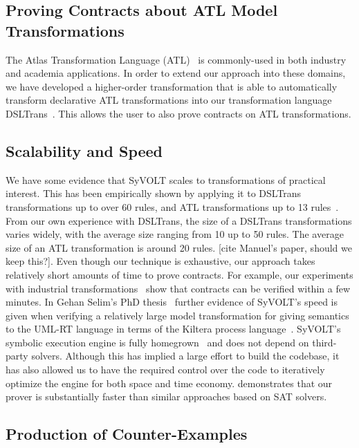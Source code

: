\subsection{Proving Contracts about ATL Model Transformations}
The Atlas Transformation Language (ATL)~\cite{atlTool} is commonly-used in both
industry and academia applications. In order to extend our approach into these domains, we
have developed a higher-order transformation that is able to automatically
transform declarative ATL transformations into our transformation language
DSLTrans~\cite{Oakes}. This allows the user to also prove contracts on
ATL transformations.

\subsection{Scalability and Speed}

We have some evidence that SyVOLT scales to transformations of practical
interest. This has been empirically shown by applying it to DSLTrans
transformations up to over 60 rules, and ATL transformations up to 13
rules~\cite{Oakes}. From our own experience with DSLTrans, the size of a
DSLTrans transformations varies widely, with the average size ranging from 10 up
to 50 rules. The average size of an ATL transformation is around 20 rules. [cite
Manuel's paper, should we keep this?].
Even though our technique is exhaustive, our approach takes relatively short
amounts of time to prove contracts. For example, our experiments with industrial
transformations~\cite{Oakes} show that contracts can be verified within a few
minutes. In Gehan Selim's PhD thesis~\cite{Selim2015}
further evidence of SyVOLT's speed is given when verifying a relatively large
model transformation for giving semantics to the UML-RT language in terms of
the Kiltera process language~\cite{PosseDingel2014}. SyVOLT's symbolic execution
engine is fully homegrown~\cite{LucioVang} and does not depend on third-party
solvers. Although this has implied a large effort to build the codebase, it has
also allowed us to have the required control over the code to iteratively
optimize the engine for both space and time economy. \cite{Selim2014}
demonstrates that our prover is substantially faster than similar approaches based on SAT solvers.


\subsection{Production of Counter-Examples}

